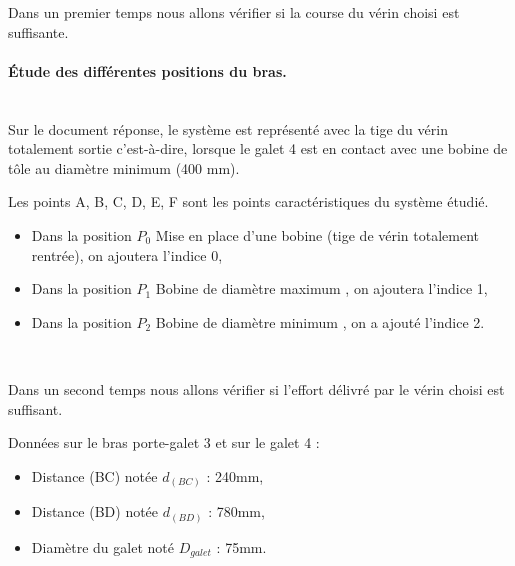Dans un premier temps nous allons vérifier si la course du vérin choisi est suffisante.

\paragraph{Étude des différentes positions du bras.} ~\ \\
Sur le document réponse, le système est représenté avec la tige du vérin totalement sortie c'est-à-dire, lorsque le galet 4 est en contact avec une bobine de tôle au diamètre minimum (400 mm).

Les points A, B, C, D, E, F sont les points caractéristiques du système étudié.
\begin{itemize}
 \item Dans la position $P_0$ \og Mise en place d'une bobine \fg (tige de vérin totalement rentrée), on
ajoutera l'indice 0,
 \item Dans la position $P_1$ \og Bobine de diamètre maximum \fg, on ajoutera l'indice 1,
 \item Dans la position $P_2$ \og Bobine de diamètre minimum \fg, on a ajouté l'indice 2.
\end{itemize}





~\

Dans un second temps nous allons vérifier si l'effort délivré par le vérin choisi est suffisant.

Données sur le bras porte-galet 3 et sur le galet 4 :
\begin{itemize}
 \item Distance (BC) notée $d_{(BC)}$ : 240mm,
 \item Distance (BD) notée $d_{(BD)}$ : 780mm,
 \item Diamètre du galet noté $D_{galet}$ : 75mm.
\end{itemize}

